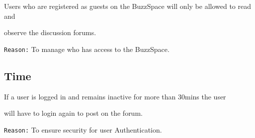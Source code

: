 \documentclass[a4paper,12pt]{report}
\begin{document}
	\begin{description}
	\item[$\bullet$] 
Users who are registered as guests on the BuzzSpace will only be allowed to read and \item observe the discussion forums. 
\item \texttt{Reason:} To manage who has access to the BuzzSpace.
\end{description}

\subsection{Time}
	\begin{description}
\item If a user is logged in and remains inactive for more than 30mins the user 
\item will have to login again to post on the forum. 
\item \texttt{Reason:} To ensure security for user Authentication. 
\end{description}
\end{document}
